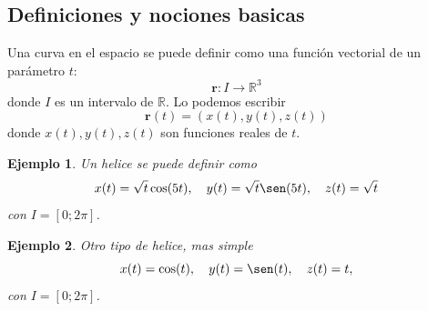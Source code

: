 \documentclass[11pt]{book}
\theoremstyle{definicion}
\theoremstyle{teorema}
\theoremstyle{ejemplo}
\newtheorem{example}{Ejemplo}
\begin{document}










\subsection{Definiciones y nociones basicas}
\noindent Una curva en el espacio se puede definir como una función vectorial de un parámetro \(t\):
\[
\mathbf{r} : I \rightarrow \mathbb{R}^3
\]
donde $I$ es un intervalo de $\mathbb{R}$. Lo %
podemos escribir
\[ \mathbf{r}(t) = (x(t), y(t), z(t)) \]
donde \(x(t), y(t), z(t)\) son funciones reales de \(t\).

\begin{example}
Un helice se puede definir como
\[
x(t)=\sqrt{t} \cos(5t), \quad
y(t)=\sqrt{t} \sen(5t), \quad
z(t)=\sqrt{t}
\] con
$I=[0;2\pi]$.
\end{example}

\begin{example}
Otro tipo de helice, mas simple
\[
x(t)=\cos(t), \quad
y(t)=\sen(t), \quad
z(t)=t,
\]
con
$I=[0;2\pi]$.
\end{example}
\end{document}
